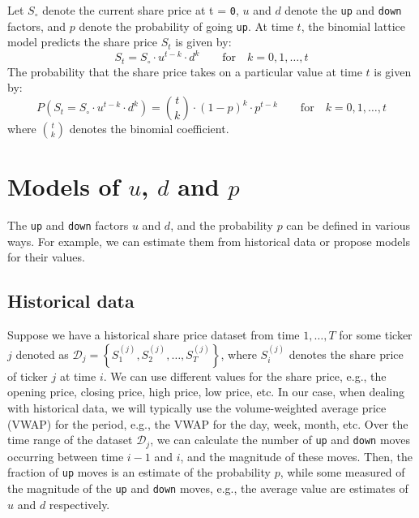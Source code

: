 \documentclass[11pt]{article}
\theoremstyle{definition}
\begin{document}
\begin{definition}\label{defn-binomial-distribution}
	Let $S_{\circ}$ denote the current share price at t = \texttt{0}, $u$ and $d$ denote the \texttt{up} and \texttt{down} factors, 
	and $p$ denote the probability of going \texttt{up}.
	At time $t$, the binomial lattice model predicts the share price $S_{t}$ is given by:
	\begin{equation*}
	S_{t} = S_{\circ}\cdot{u}^{t-k}\cdot{d}^{k}\qquad\text{for}\quad{k=0,1,\dots,t}
	\end{equation*}
	The probability that the share price takes on a particular value at time $t$ is given by:
	\begin{equation*}
	P(S_{t} = S_{\circ}\cdot{u}^{t-k}\cdot{d}^{k}) = \binom{t}{k}\cdot{(1-p)}^{k}\cdot{p}^{t-k}\qquad\text{for}\quad{k=0,1,\dots,t}
	\end{equation*}
	where $\binom{t}{k}$ denotes the binomial coefficient.
\end{definition}

\section*{Models of $u$, $d$ and $p$}
The \texttt{up} and \texttt{down} factors $u$ and $d$, and the probability $p$ can be defined in various ways.  
For example, we can estimate them from historical data or propose models for their values. 

\subsection*{Historical data}
Suppose we have a historical share price dataset from time $1,\dots, T$ for some ticker $j$ denoted as $\mathcal{D}_{j} = \left\{S^{(j)}_{1},S^{(j)}_{2},\dots, S^{(j)}_{T}\right\}$, 
where $S^{(j)}_{i}$ denotes the share price of ticker $j$ at time $i$.
We can use different values for the share price, e.g., the opening price, closing price, high price, low price, etc. 
In our case, when dealing with historical data, we will typically use the volume-weighted average price (VWAP) for the period, 
e.g., the VWAP for the day, week, month, etc. Over the time range of the dataset $\mathcal{D}_{j}$, we can calculate the number of \texttt{up} and \texttt{down} moves
occurring between time $i-1$ and $i$, and the magnitude of these moves. 
Then, the fraction of \texttt{up} moves is an estimate of the probability $p$, 
while some measured of the magnitude of the \texttt{up} and \texttt{down} moves, e.g., the average value are estimates of $u$ and $d$ respectively.
\end{document}
